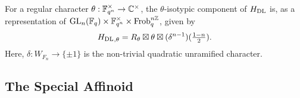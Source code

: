 \documentclass[../main.tex]{subfiles}
\begin{document}
\begin{thm}[]
  For a regular character $\theta: \mathbb{F}_{q^n}^\times \to \mathbb{C}^\times$, the 
  $\theta$-isotypic component of $H_\mathrm{DL}$ is, as a representation of 
  $\operatorname{GL}_n(\mathbb{F}_q) \times \mathbb{F}_{q^n}^\times \times \operatorname{Frob}_q^{n\mathbb{Z}}$, given by 
  \begin{equation*}
    {H_\mathrm{DL}}_{,\theta} = R_\theta \boxtimes \theta \boxtimes (\delta^{n-1})(\tfrac{1-n}2).
  \end{equation*}
  Here, $\delta: W_{F_n} \to \{\pm 1\}$ is the non-trivial quadratic unramified character.
\end{thm}


\subsection{The Special Affinoid} %
\label{sub:The Special Affinoid}
\begin{defi}
  \todo{}
\end{defi}

\end{document}
